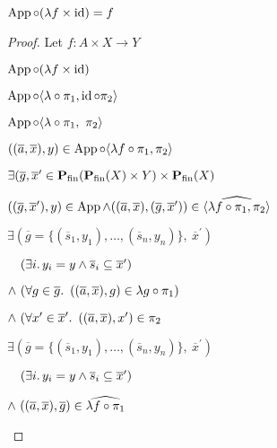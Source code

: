 \begin{prop}
  $\operatorname{App}\circ(\lambda f\times\operatorname{id}) = f$
  \begin{proof}
    Let $f : A\times X\to Y$
    \begin{itemize}
      \step
        $\operatorname{App}\circ(\lambda f\times\operatorname{id})$

      \step[=]
        $\operatorname{App}\circ\langle\lambda\circ\pi_1,\operatorname{id}\circ\pi_2\rangle$
        \marginnote{\Def-$\times$}

      \step[=]
        $\operatorname{App}\circ\langle\lambda\circ\pi_1,~\pi_2\rangle$
        \marginnote{\Def-$\id$}

      \step
        $((\overline{a},\overline{x}), y)\in\operatorname{App}\circ\langle\lambda f\circ\pi_1,\pi_2\rangle$

      \step[\iffs]
        $\exists(\overline{g},\overline{x}^\prime\in\mathbf{P}_{\operatorname{fin}}(\mathbf{P}_{\operatorname{fin}}(X)\times Y)\times\mathbf{P}_{\operatorname{fin}}(X)$
        \marginnote{\Def-\ref{def:crel-comp}}

      \addtolength{\itemsep}{-.3\baselineskip}
      \step
        \quad$((\overline{g},\overline{x}^\prime), y)\in\operatorname{App}\land((\overline{a},\overline{x}),(\overline{g},\overline{x}^\prime))\in\widehat{\langle\lambda f\circ\pi_1,\pi_2\rangle}$

      \addtolength{\itemsep}{.3\baselineskip}

      \step[\iffs]
        $\exists(\overline{g} = \{(\overline{s}_1,y_1),\ldots,(\overline{s}_n,y_n)\},~\overline{x}^\prime)$

      \addtolength{\itemsep}{-.3\baselineskip}
      \step
        \quad$\phantom{\land}~(\exists i\ldotp y_i=y\land\overline{s}_i\subseteq\overline{x}^\prime)$
        \marginnote{\Def-$\App$}

      \step
        \quad$\land~(\forall g\in\overline{g}\ldotp~((\overline{a},\overline{x}),g)\in\lambda g\circ\pi_1)$

      \step
        \quad$\land~(\forall x^\prime\in\overline{x}^\prime\ldotp~((\overline{a},\overline{x}), x^\prime)\in\pi_2$
      \addtolength{\itemsep}{.3\baselineskip}

      \step[\iffs]
        $\exists(\overline{g} = \{(\overline{s}_1,y_1),\ldots,(\overline{s}_n,y_n)\},~\overline{x}^\prime)$

      \addtolength{\itemsep}{-.3\baselineskip}
      \step
        \quad$\phantom{\land}~(\exists i\ldotp y_i=y\land\overline{s}_i\subseteq\overline{x}^\prime)$

      \step
        \quad$\land~((\overline{a},\overline{x}), \overline{g})\in\widehat{\lambda f\circ\pi_1}$
        \marginnote{\Def-$~\widehat{\cdot}$}


\end{itemize}
\end{proof}
\end{prop}
